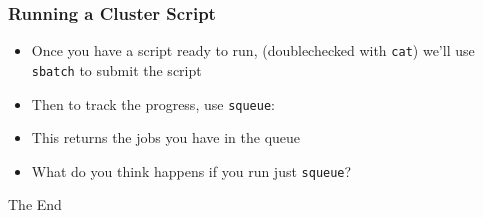 \documentclass[14pt]{beamer}
\begin{document}
\begin{frame}
\frametitle{Running a Cluster Script}
\begin{itemize}
	\item Once you have a script ready to run, (doublechecked with \texttt{cat}) we'll use \texttt{sbatch} to submit the script
	\ttfamily
	\sffamily
	\normalsize
	\item Then to track the progress, use \texttt{squeue}:
	\ttfamily
	\normalsize
	\sffamily
	\item This returns the jobs you have in the queue
	\item What do you think happens if you run just \texttt{squeue}?
\end{itemize}
\end{frame}


\begin{frame}
\Huge{\centerline{The End}}
\end{frame}

\end{document}
